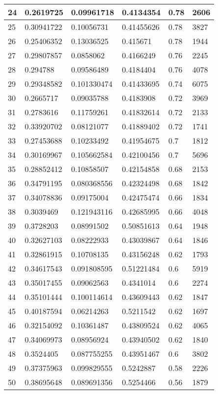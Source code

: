 \begin{longtable}{|l|l|l|l|l|l|}
24 & 0.2619725 & 0.09961718 & 0.4134354 & 0.78 & 2606 \\ \hline 
25 & 0.30941722 & 0.10056731 & 0.41455626 & 0.78 & 3827 \\ \hline 
26 & 0.25406352 & 0.13036525 & 0.415671 & 0.78 & 1944 \\ \hline 
27 & 0.29807857 & 0.0858062 & 0.4166249 & 0.76 & 2245 \\ \hline 
28 & 0.294788 & 0.09586489 & 0.4184404 & 0.76 & 4078 \\ \hline 
29 & 0.29348582 & 0.101330474 & 0.41433695 & 0.74 & 6075 \\ \hline 
30 & 0.2665717 & 0.09035788 & 0.4183908 & 0.72 & 3969 \\ \hline 
31 & 0.2783616 & 0.11759261 & 0.41832614 & 0.72 & 2133 \\ \hline 
32 & 0.33920702 & 0.08121077 & 0.41889402 & 0.72 & 1741 \\ \hline 
33 & 0.27453688 & 0.10233492 & 0.41954675 & 0.7 & 1812 \\ \hline 
34 & 0.30169967 & 0.105662584 & 0.42100456 & 0.7 & 5696 \\ \hline 
35 & 0.28852412 & 0.10858507 & 0.42154858 & 0.68 & 2153 \\ \hline 
36 & 0.34791195 & 0.080368556 & 0.42324498 & 0.68 & 1842 \\ \hline 
37 & 0.34078836 & 0.09175004 & 0.42475474 & 0.66 & 1834 \\ \hline 
38 & 0.3039469 & 0.121943116 & 0.42685995 & 0.66 & 4048 \\ \hline 
39 & 0.3728203 & 0.08991502 & 0.50851613 & 0.64 & 1948 \\ \hline 
40 & 0.32627103 & 0.08222933 & 0.43039867 & 0.64 & 1846 \\ \hline 
41 & 0.32861915 & 0.10708135 & 0.43156248 & 0.62 & 1793 \\ \hline 
42 & 0.34617543 & 0.091808595 & 0.51221484 & 0.6 & 5919 \\ \hline 
43 & 0.35017455 & 0.09062563 & 0.4341014 & 0.6 & 2274 \\ \hline 
44 & 0.35101444 & 0.100114614 & 0.43609443 & 0.62 & 1847 \\ \hline 
45 & 0.40187594 & 0.06214263 & 0.5211542 & 0.62 & 1697 \\ \hline 
46 & 0.32154092 & 0.10361487 & 0.43809524 & 0.62 & 4065 \\ \hline 
47 & 0.34069973 & 0.08956924 & 0.43940502 & 0.62 & 1840 \\ \hline 
48 & 0.3524405 & 0.087755255 & 0.43951467 & 0.6 & 3802 \\ \hline 
49 & 0.37375963 & 0.099829555 & 0.5242887 & 0.58 & 2226 \\ \hline 
50 & 0.38695648 & 0.089691356 & 0.5254466 & 0.56 & 1879 \\ \hline 
\end{longtable}